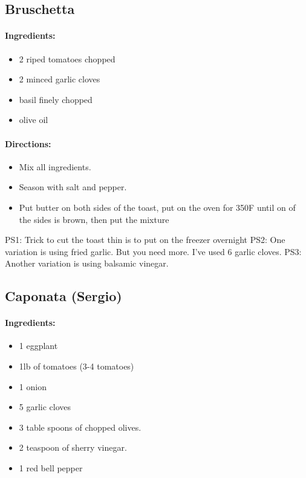 \documentclass{article}
\begin{document}
\subsection{Bruschetta}

\paragraph{Ingredients:}

\begin{itemize}
	\item 2 riped tomatoes chopped
	\item 2 minced garlic cloves
	\item basil finely chopped
	\item olive oil
\end{itemize}

\paragraph{Directions:}
\begin{itemize}
	\item Mix all ingredients.
	\item Season with salt and pepper.
	\item Put butter on both sides of the toast, put on the oven for 350F until on of the sides is brown, then put the mixture
\end{itemize}

PS1: Trick to cut the toast thin is to put on the freezer overnight
PS2: One variation is using fried garlic. But you need more. I've used 6 garlic cloves.
PS3: Another variation is using balsamic vinegar.

\subsection{Caponata (Sergio)}

\paragraph{Ingredients:}

\begin{itemize}
	\item 1 eggplant
	\item 1lb of tomatoes (3-4 tomatoes)
	\item 1 onion
	\item 5 garlic cloves
	\item 3 table spoons of chopped olives.
	\item 2 teaspoon of sherry vinegar.
	\item 1 red bell pepper
\end{itemize}
\end{document}
